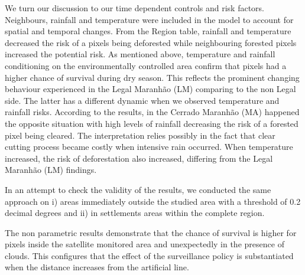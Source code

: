 We turn our discussion to our time dependent controls and risk factors. Neighbours, rainfall and temperature were included in the model to account for spatial and temporal changes. From the Region table, rainfall and temperature decreased the risk of a pixels being deforested while neighbouring forested pixels increased the potential risk. As mentioned above, temperature and rainfall conditioning on the environmentally controlled area confirm that pixels had a higher chance of survival during dry season. This reflects the prominent changing behaviour experienced in the Legal Maranhão (LM) comparing to the non Legal side. The latter has a different dynamic when we observed temperature and rainfall risks. According to the results, in the Cerrado Maranhão (MA) happened the opposite situation with high levels of rainfall decreasing the risk of a forested pixel being cleared. The interpretation relies possibly in the fact that clear cutting process became costly when intensive rain occurred. When temperature increased, the risk of deforestation also increased, differing from the Legal Maranhão (LM) findings.


In an attempt to check the validity of the results, we conducted the same approach on i) areas immediately outside the studied area with a threshold of 0.2 decimal degrees and ii) in settlements areas within the complete region. 

The non parametric results demonstrate that the chance of survival is higher for pixels inside the satellite monitored area and unexpectedly in the presence of clouds. This configures that the effect of the surveillance policy is substantiated when the distance increases from the artificial line. 

